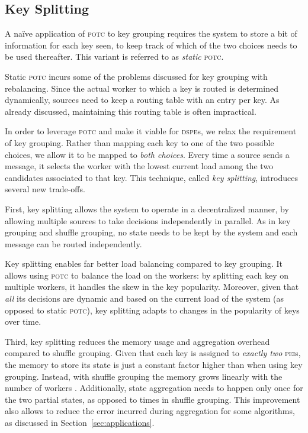 \documentclass[10pt,conference,letterpaper]{IEEEtran}
\newcommand{\pei}{\textsc{pei}\xspace}
\newcommand{\peis}{{\pei}s\xspace}
\newcommand{\potc}{\textsc{p\textup{o}tc}\xspace}
\newcommand{\dspe}{\textsc{dspe}\xspace}
\newcommand{\dspes}{{\dspe}s\xspace}
\begin{document}
\subsection{Key Splitting}

A na\"{i}ve application of \potc to key grouping requires the system to store a bit of information for each key seen, to keep track of which of the two choices needs to be used thereafter.
This variant is referred to as \emph{static} \potc.

Static \potc incurs some of the problems discussed for key grouping with rebalancing.
Since the actual worker to which a key is routed is determined dynamically, sources need to keep a routing table with an entry per key.
As already discussed, maintaining this routing table is often impractical.

In order to leverage \potc and make it viable for \dspes, we relax the requirement of key grouping.
Rather than mapping each key to one of the two possible choices, we allow it to be mapped to \emph{both choices}.
Every time a source sends a message, it selects the worker with the lowest current load among the two candidates associated to that key.
This technique, called \emph{key splitting}, introduces several new trade-offs.

First, key splitting allows the system to operate in a decentralized manner, by allowing multiple sources to take decisions independently in parallel.
As in key grouping and shuffle grouping, no state needs to be kept by the system and each message can be routed independently.

Key splitting enables far better load balancing compared to key grouping.
It allows using \potc to balance the load on the workers:
by splitting each key on multiple workers, it handles the skew in the key popularity.
Moreover, given that \emph{all} its decisions are dynamic and based on the current load of the system (as opposed to static \potc), key splitting adapts to changes in the popularity of keys over time.

Third, key splitting reduces the memory usage and aggregation overhead compared to shuffle grouping.
Given that each key is assigned to \emph{exactly two} \peis, the memory to store its state is just a constant factor higher than when using key grouping.
Instead, with shuffle grouping the memory grows linearly with the number of workers .
Additionally, state aggregation needs to happen only once for the two partial states, as opposed to  times in shuffle grouping.
This improvement also allows to reduce the error incurred during aggregation for some algorithms, as discussed in Section~\ref{sec:applications}.
\end{document}

